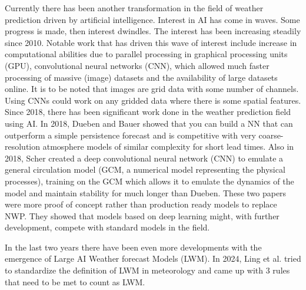 Currently there has been another transformation in the field of weather prediction driven by artificial intelligence. Interest in AI has come in waves. Some progress is made, then interest dwindles. The interest has been increasing steadily since 2010. Notable work that has driven this wave of interest include increase in computational abilities due to parallel processing in graphical processing units (GPU), convolutional neural networks (CNN), which allowed much faster processing of massive (image) datasets and the availability of large datasets online. It is to be noted that images are grid data with some number of channels. Using CNNs could work on any gridded data where there is some spatial features\cite{canNNBeatNWP}. Since 2018, there has been significant work done in the weather prediction field using AI. In 2018, Dueben and Bauer showed that you can build a NN that can outperform a simple persistence forecast and is competitive with very coarse-resolution atmosphere models of similar complexity for short lead times\cite{dueben2018}. Also in 2018, Scher created a deep convolutional neural network (CNN) to emulate a general circulation model (GCM, a numerical model representing the physical processes), training on the GCM which allows it to emulate the dynamics of the model and maintain stability for much longer than Dueben\cite{scher2018}. These two papers were more proof of concept rather than production ready models to replace NWP. They showed that models based on deep learning might, with further development, compete with standard models in the field.

In the last two years there have been even more developments with the emergence of Large AI Weather forecast Models (LWM). In 2024, Ling et al.\cite{SecondRevolution} tried to standardize the definition of LWM in meteorology and came up with 3 rules that need to be met to count as LWM.

